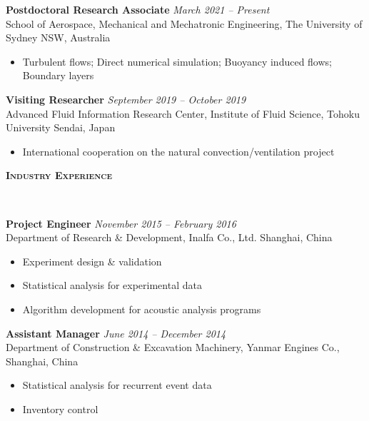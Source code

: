 \documentclass[letterpaper, 10pt]{article}
\newenvironment{changemargin}[2]{%
  \begin{list}{}{%
      \setlength{\topsep}{0pt}%
      \setlength{\leftmargin}{#1}%
      \setlength{\rightmargin}{#2}%
      \setlength{\listparindent}{\parindent}%
      \setlength{\itemindent}{\parindent}%
      \setlength{\parsep}{\parskip}%
    }%
  \item[]}{\end{list}
}
\newcommand{\lineover}{
  \begin{changemargin}{-0.05in}{-0.05in}
    \vspace*{-8pt}
    \hrulefill \\
    \vspace*{-2pt}
  \end{changemargin}
}
\newcommand{\header}[1]{
  \begin{changemargin}{-0.5in}{-0.5in}
    \textbf{\scshape{#1}}\\
    \lineover
  \end{changemargin}
}
\newenvironment{body} {
  \vspace*{-16pt}
  \begin{changemargin}{-0.25in}{-0.5in}
  }
  {\end{changemargin}
}
\begin{document}
\begin{body}
	\vspace{14pt}
	\textbf{Postdoctoral Research Associate}\hfill
	\emph{March 2021 -- Present} \\
	School of Aerospace, Mechanical and Mechatronic Engineering, The University of Sydney   \hfill NSW, Australia
	\vspace{-2pt}
	\begin{itemize}
		\setlength{\itemindent}{0in}
		\setlength{\itemsep}{0in}
		\item Turbulent flows; Direct numerical simulation; Buoyancy induced flows; Boundary layers 
	\end{itemize}

	\vspace{14pt}
	\textbf{Visiting Researcher}\hfill
	\emph{September 2019 -- October 2019} \\
	Advanced Fluid Information Research Center, Institute of Fluid Science, Tohoku University   \hfill Sendai, Japan
	\vspace{-2pt}
	\begin{itemize}
		\setlength{\itemindent}{0in}
		\setlength{\itemsep}{0in}
		\item International cooperation on the natural convection/ventilation project 
	\end{itemize}

	
\end{body}
\smallskip
\header{Industry Experience}
\begin{body}
	\vspace{14pt}
	
	\textbf{Project Engineer}\hfill
	\emph{November 2015 -- February 2016} \\
	Department of Research \& Development, Inalfa Co., Ltd.  \hfill Shanghai, China
	\vspace{-2pt}
	\begin{itemize}
		\setlength{\itemindent}{0in}
		\setlength{\itemsep}{0in}
		\item Experiment design \& validation
		\item Statistical analysis for experimental data
		\item Algorithm development for acoustic analysis programs
	\end{itemize}
	
	
	\textbf{Assistant Manager}\hfill
	\emph{June 2014 -- December 2014} \\
	Department of Construction \& Excavation Machinery, Yanmar Engines Co.,  \hfill Shanghai, China
	\vspace{-2pt}
	\begin{itemize}
		\setlength{\itemindent}{0in}
		\setlength{\itemsep}{0in}
		\item Statistical analysis for recurrent event data
		\item Inventory control
	\end{itemize}
	

\end{body}
\smallskip
\end{document}
